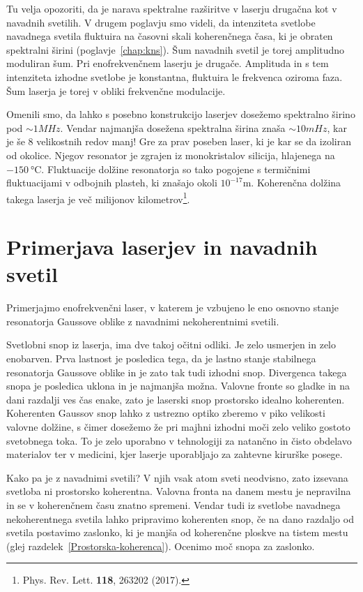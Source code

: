 Tu velja opozoriti, da je narava spektralne razširitve v laserju 
drugačna kot v navadnih svetilih. V drugem poglavju smo videli, da 
intenziteta svetlobe navadnega svetila fluktuira na časovni skali 
koherenčnega časa, ki je obraten spektralni širini (poglavje~\ref{chap:kns}). 
Šum navadnih svetil je torej amplitudno moduliran šum. Pri 
enofrekvenčnem laserju je drugače. Amplituda in s tem intenziteta 
izhodne svetlobe je konstantna, fluktuira le frekvenca oziroma
faza. Šum laserja je torej v obliki frekvenčne modulacije.

\begin{remark}
Omenili smo, da lahko s posebno konstrukcijo laserjev dosežemo
spektralno širino pod $\sim 1\si{MHz}$. Vendar najmanjša dosežena spektralna širina
znaša $\sim 10\si{mHz}$, kar je še 8 velikostnih redov manj! Gre za prav poseben 
laser, ki je kar se da izoliran od okolice. Njegov resonator je zgrajen iz 
monokristalov silicija, hlajenega na $-150~\si{\celsius}$. Fluktuacije
dolžine resonatorja so tako pogojene s termičnimi fluktuacijami 
v odbojnih plasteh, ki znašajo okoli $10^{-17}\si{\metre}$. 
Koherenčna dolžina takega laserja je več
milijonov kilometrov\footnote{Phys. Rev. Lett. {\bf 118}, 263202 (2017).}. 
\end{remark}

\section{Primerjava laserjev in navadnih svetil}
Primerjajmo enofrekvenčni laser, v katerem je vzbujeno le eno osnovno
stanje resonatorja Gaussove oblike z navadnimi nekoherentnimi svetili. 

Svetlobni snop iz laserja, ima dve takoj očitni odliki. Je zelo
usmerjen in zelo enobarven. Prva lastnost je posledica tega, da je
lastno stanje stabilnega resonatorja Gaussove oblike in je zato tak tudi
izhodni snop. Divergenca takega snopa je posledica uklona in je 
najmanjša možna. Valovne fronte so gladke in na dani razdalji ves 
čas enake, zato je laserski snop prostorsko idealno koherenten. 
Koherenten Gaussov snop lahko z ustrezno optiko zberemo v piko velikosti
valovne dolžine, s čimer dosežemo že pri majhni izhodni moči zelo veliko
gostoto svetobnega toka. To je zelo uporabno v tehnologiji za natančno in
čisto obdelavo materialov ter v medicini, kjer laserje uporabljajo za
zahtevne kirurške posege.

Kako pa je z navadnimi svetili? V njih vsak atom sveti neodvisno, zato
izsevana svetloba ni prostorsko koherentna. Valovna fronta na danem 
mestu je nepravilna in se v koherenčnem času znatno spremeni. 
Vendar tudi iz svetlobe navadnega nekoherentnega svetila lahko pripravimo
koherenten snop, če na dano razdaljo od svetila postavimo zaslonko, ki
je manjša od koherenčne ploskve na tistem mestu (glej 
razdelek~\ref{Prostorska-koherenca}). Ocenimo moč snopa za zaslonko. 

